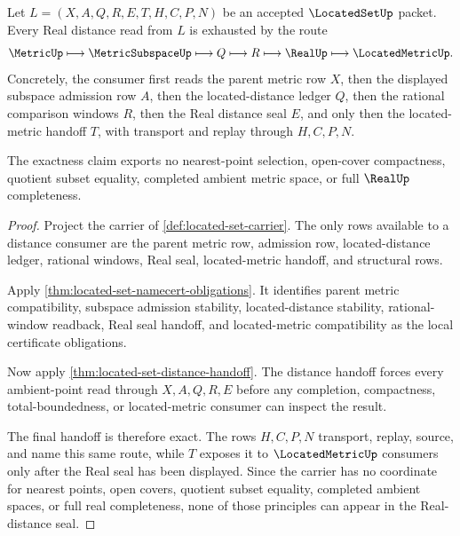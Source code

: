 \begin{theorem}
\label{thm:located-set-real-distance-seal-exactness}
Let $L=(X,A,Q,R,E,T,H,C,P,N)$ be an accepted $\LocatedSetUp$ packet. Every Real distance read from $L$ is exhausted by the route
$$
\MetricUp \longmapsto \MetricSubspaceUp \longmapsto Q \longmapsto R \longmapsto \RealUp \longmapsto \LocatedMetricUp .
$$
Concretely, the consumer first reads the parent metric row $X$, then the displayed subspace admission row $A$, then the located-distance ledger $Q$, then the rational comparison windows $R$, then the Real distance seal $E$, and only then the located-metric handoff $T$, with transport and replay through $H,C,P,N$.

The exactness claim exports no nearest-point selection, open-cover compactness, quotient subset equality, completed ambient metric space, or full $\RealUp$ completeness.
\end{theorem}
\begin{proof}
Project the carrier of \autoref{def:located-set-carrier}. The only rows available to a distance consumer are the parent metric row, admission row, located-distance ledger, rational windows, Real seal, located-metric handoff, and structural rows.

Apply \autoref{thm:located-set-namecert-obligations}. It identifies parent metric compatibility, subspace admission stability, located-distance stability, rational-window readback, Real seal handoff, and located-metric compatibility as the local certificate obligations.

Now apply \autoref{thm:located-set-distance-handoff}. The distance handoff forces every ambient-point read through $X,A,Q,R,E$ before any completion, compactness, total-boundedness, or located-metric consumer can inspect the result.

The final handoff is therefore exact. The rows $H,C,P,N$ transport, replay, source, and name this same route, while $T$ exposes it to $\LocatedMetricUp$ consumers only after the Real seal has been displayed. Since the carrier has no coordinate for nearest points, open covers, quotient subset equality, completed ambient spaces, or full real completeness, none of those principles can appear in the Real-distance seal.
\end{proof}

